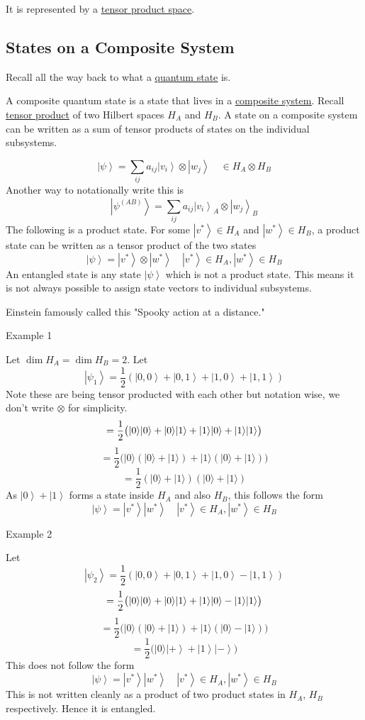 \documentclass[
]{article}
\let\oldhyperref\hyperref
\renewcommand{\hyperref}[2][]{\oldhyperref[#1]{\underline{#2}}}
\providecommand{\ket}[1]{\left\lvert #1 \right\rangle}
\begin{document}
It is represented by a \hyperref[tensor-product-space]{tensor product space}.

\subsection{States on a Composite System}\label{states-on-a-composite-system}
Recall all the way back to what a \hyperref[ket-states]{quantum state} is.

A composite quantum state is a state that lives in a \hyperref[composite-system]{composite system}.
Recall \hyperref[tensor-product]{tensor product} of two Hilbert spaces $H_A$ and $H_B$.
A state on a composite system can be written as a sum of tensor products of states on the individual subsystems.

\[
	\ket{\psi}=\sum_{ij} a_{ij}\ket{v_i	}\otimes\ket{w_j}\quad \in H_A\otimes H_B
\]
Another way to notationally write this is
\[
	\boxed{\ket{\psi^{(AB)}}=\sum_{ij} a_{ij}\ket{v_i}_A\otimes\ket{w_j}_B}
\]
The following is a product state. For some $\ket{v^*}\in H_A$ and $\ket{w^*}\in H_B$, a product state can be written as a tensor product of the two states
\[
	\ket{\psi}=\ket{v^*}\otimes\ket{w^*}\quad \ket{v^*}\in H_A, \ket{w^*}\in H_B
\]
An entangled state is any state $\ket{\psi}$ which is not a product state. This means it is not always possible to assign state vectors to individual subsystems.

Einstein famously called this "Spooky action at a distance."

Example 1

Let $\dim H_A = \dim H_B = 2$. Let
\[
	\ket{\psi_1}=\frac{1}{2}(\ket{0,0}+\ket{0,1}+\ket{1,0}+\ket{1,1})
\]
Note these are being tensor producted with each other but notation wise, we don't write $\otimes$ for simplicity.
\[
	= \frac{1}{2}\big(|0\rangle |0\rangle + |0\rangle |1\rangle + |1\rangle |0\rangle + |1\rangle |1\rangle\big) \\
\]
\[
	= \frac{1}{2}\big(|0\rangle(|0\rangle + |1\rangle) + |1\rangle(|0\rangle + |1\rangle)\big)
\]
\[
	= \frac{1}{2}(|0\rangle + |1\rangle)(|0\rangle + |1\rangle)
\]
As $\ket{0}+\ket{1}$ forms a state inside $H_A$ and also $H_B$, this follows the form
\[
	\ket{\psi}=\ket{v^*}\ket{w^*}\quad \ket{v^*}\in H_A, \ket{w^*}\in H_B
\]

Example 2

Let
\[
	\ket{\psi_2}=\frac{1}{2}(\ket{0,0}+\ket{0,1}+\ket{1,0}-\ket{1,1})
\]
\[
	= \frac{1}{2}\big(|0\rangle |0\rangle + |0\rangle |1\rangle + |1\rangle |0\rangle - |1\rangle |1\rangle\big) \\
\]
\[
	= \frac{1}{2}\big(|0\rangle(|0\rangle + |1\rangle) + |1\rangle(|0\rangle - |1\rangle)\big)
\]
\[
	= \frac{1}{2}\big(|0\rangle\ket{+}+\ket{1}\ket{-}\big)
\]
This does not follow the form
\[
	\ket{\psi}=\ket{v^*}\ket{w^*}\quad \ket{v^*}\in H_A, \ket{w^*}\in H_B
\]
This is not written cleanly as a product of two product states in $H_A$, $H_B$ respectively. Hence it is entangled.
\end{document}
